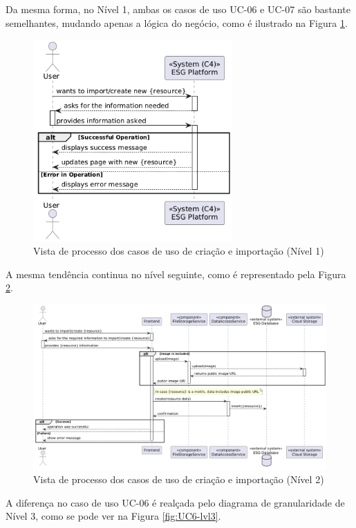 Da mesma forma, no Nível 1, ambas os casos de uso UC-06 e UC-07 são bastante semelhantes, mudando apenas a lógica do negócio, como é ilustrado na Figura \ref{fig:UC67-lvl1}.

\begin{figure}[H]
\centering
\includegraphics[width=3in]{frontmatter/assets/diagrams/Process Views/UC67-lvl1.png}
\caption{Vista de processo dos casos de uso de criação e importação (Nível 1)}
\label{fig:UC67-lvl1}
\end{figure}

A mesma tendência continua no nível seguinte, como é representado pela Figura \ref{fig:UC67-lvl2}.

\begin{figure}[H]
\centering
\includegraphics[width=\linewidth]{frontmatter/assets/diagrams/Process Views/UC67-lvl2.png}
\caption{Vista de processo dos casos de uso de criação e importação (Nível 2)}
\label{fig:UC67-lvl2}
\end{figure}

A diferença no caso de uso UC-06 é realçada pelo diagrama de granularidade de Nível 3, como se pode ver na Figura \ref{fig:UC6-lvl3}.

